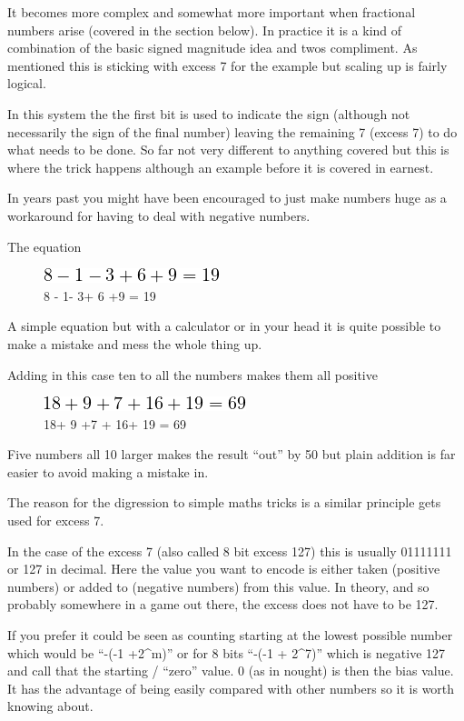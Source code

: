 \documentclass[
]{book}
\begin{document}
It becomes more complex and somewhat more important when fractional numbers arise (covered in the section below). In practice it is a kind of combination of the basic signed magnitude idea and twos compliment. As mentioned this is sticking with excess 7 for the example but scaling up is fairly logical.

In this system the the first bit is used to indicate the sign (although not necessarily the sign of the final number) leaving the remaining 7 (excess 7) to do what needs to be done. So far not very different to anything covered but this is where the trick happens although an example before it is covered in earnest.

In years past you might have been encouraged to just make numbers huge as a workaround for having to deal with negative numbers.

The equation

\begin{figure}
\centering
\includegraphics{images/romhacking20200x.png}
\caption{8 - 1- 3+ 6 +9 = 19}
\end{figure}

A simple equation but with a calculator or in your head it is quite possible to make a mistake and mess the whole thing up.

Adding in this case ten to all the numbers makes them all positive

\begin{figure}
\centering
\includegraphics{images/romhacking20201x.png}
\caption{18+ 9 +7 + 16+ 19 = 69}
\end{figure}

Five numbers all 10 larger makes the result ``out'' by 50 but plain addition is far easier to avoid making a mistake in.

The reason for the digression to simple maths tricks is a similar principle gets used for excess 7.

In the case of the excess 7 (also called 8 bit excess 127) this is usually 01111111 or 127 in decimal. Here the value you want to encode is either taken (positive numbers) or added to (negative numbers) from this value. In theory, and so probably somewhere in a game out there, the excess does not have to be 127.

If you prefer it could be seen as counting starting at the lowest possible number which would be ``-(-1 +2\^{}m)'' or for 8 bits ``-(-1 + 2\^{}7)'' which is negative 127 and call that the starting / ``zero'' value. 0 (as in nought) is then the bias value. It has the advantage of being easily compared with other numbers so it is worth knowing about.
\end{document}
